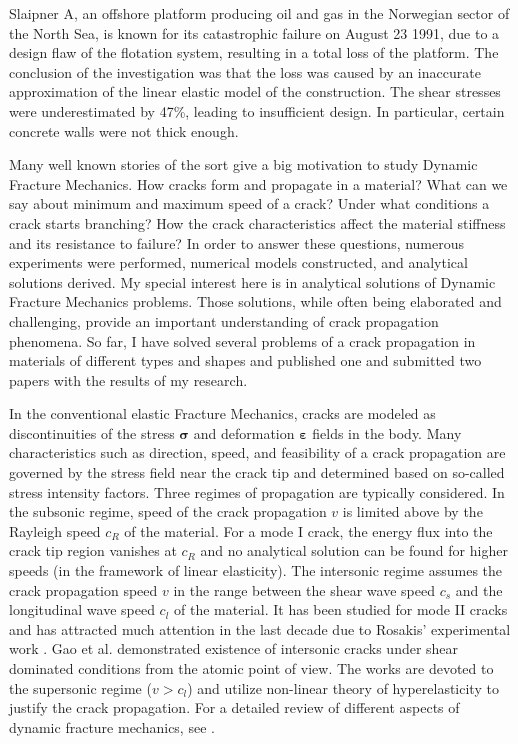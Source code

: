 \documentclass[11pt]{amsart}
\begin{document}
Slaipner A, an offshore platform producing oil and gas in the Norwegian sector of the North Sea, is known for its catastrophic failure on August 23 1991, due to a design flaw of the flotation system, resulting in a total loss of the platform. The conclusion of the investigation was that the loss was caused by an inaccurate approximation of the linear elastic model of the construction. The shear stresses were underestimated by 47\%, leading to insufficient design. In particular, certain concrete walls were not thick enough.

Many well known stories of the sort give a big motivation to study Dynamic Fracture Mechanics. How cracks form and propagate in a material? What can we say about minimum and maximum speed of a crack? Under what conditions a crack starts branching? How the crack characteristics affect the material stiffness and its resistance to failure? In order to answer these questions, numerous experiments were performed, numerical models constructed, and analytical solutions derived. My special interest here is in analytical solutions of Dynamic Fracture Mechanics problems. Those solutions, while often being elaborated and challenging, provide an important understanding of crack propagation phenomena. So far, I have solved several problems of a crack propagation in materials of different types and shapes and published one and submitted two papers with the results of my research.

In the conventional elastic Fracture Mechanics, cracks are modeled as discontinuities of the stress $\boldsymbol\sigma$ and deformation $\boldsymbol\varepsilon$ fields in the body. Many characteristics such as direction, speed, and feasibility of a crack propagation are governed by the stress field near the crack tip and determined based on so-called stress intensity factors. Three regimes of propagation are typically considered. In the subsonic regime, speed of the crack propagation $v$ is limited above by the Rayleigh speed $c_R$ of the material. For a mode I crack, the energy flux into the crack tip region vanishes at $c_R$ and no analytical solution can be found for higher speeds \cite{broberg} (in the framework of linear elasticity). The intersonic regime assumes the crack propagation speed $v$ in the range between the shear wave speed $c_s$ and the longitudinal wave speed $c_l$ of the material. It has been studied for mode II cracks \cites{andrews,burridge} and has attracted much attention in the last decade due to Rosakis' experimental work \cite{rosakis}. Gao et al. \cite{gao} demonstrated existence of intersonic cracks under shear dominated conditions from the atomic point of view. The works \cites{abraham,buehler} are devoted to the supersonic regime ($v>c_l$) and utilize non-linear theory of hyperelasticity to justify the crack propagation. For a detailed review of different aspects of dynamic fracture mechanics, see \cite{cox}.
    
\end{document}
